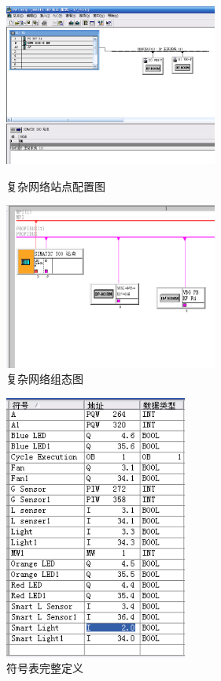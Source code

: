 \begin{figure}[htbp]
\begin{minipage}{0.5\textwidth}
\centering
\includegraphics[width=7cm]{resource/hard_config_2.png}
\caption{复杂网络站点配置图}
\label{fig:hard_conf_2}
\end{minipage}
\hfill
\begin{minipage}{0.5\textwidth}
\centering
\includegraphics[width=7cm]{resource/net_organize_2.png}
\caption{复杂网络组态图}
\label{fig:net_org_2}
\end{minipage}
\end{figure}

\begin{figure}[htbp]
\centering
\includegraphics[width=6cm]{resource/sign_form_2.png}
\caption{符号表完整定义}
\label{fig:sign_form_2}
\end{figure}

